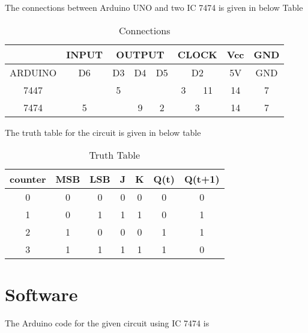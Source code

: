 \documentclass{article}
\begin{document}
	The connections between Arduino UNO and two IC 7474 is given in below Table \\
	\begin{table}[h]
	\begin{center}
	\begin{tabular}{|c|c|c|c|c|c|c|c|c|}
		\hline & INPUT & \multicolumn{3}{|c|}{OUTPUT} & \multicolumn{2}{|c|}{CLOCK} & Vcc & GND \\
		\hline ARDUINO & D6 & D3 & D4 & D5 & \multicolumn{2}{|c|}{D2} & 5V & GND \\
		\hline 7447 && 5 &&& 3 & 11 & 14 & 7 \\
		\hline 7474 & 5 && 9 & 2 & \multicolumn{2}{|c|}{3} & 14 & 7 \\
		\hline
	\end{tabular}
	\caption{Connections}
	\label{table:1}
	\end{center}
	\end{table}

	The truth table for the circuit is given in below table \\
	\begin{table}[h]
	\begin{center}
		\begin{tabular}{|c|c|c|c|c|c|c|}
		\hline counter & MSB & LSB & J & K & Q(t) & Q(t+1) \\
		\hline 0 & 0 & 0 & 0 & 0 & 0 & 0 \\
		\hline 1 & 0 & 1 & 1 & 1 & 0 & 1 \\
		\hline 2 & 1 & 0 & 0 & 0 & 1 & 1 \\
		\hline 3 & 1 & 1 & 1 & 1 & 1 & 0 \\
		\hline
		\end{tabular}
		\caption{Truth Table}
		\label{table:2}
	\end{center}
	\end{table}

\section{Software}
	The Arduino code for the given circuit using IC 7474 is \\
	
\end{document}

